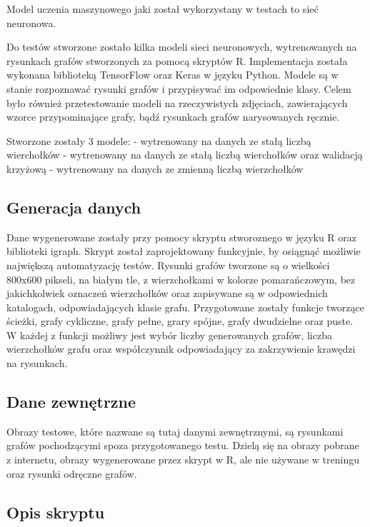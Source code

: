 Model uczenia maszynowego jaki został wykorzystany w testach to sieć neuronowa.

Do testów stworzone zostało kilka modeli sieci neuronowych,
wytrenowanych na rysunkach grafów stworzonych za pomocą skryptów R.
Implementacja została wykonana biblioteką TensorFlow oraz Keras w języku Python.
Modele są w stanie rozpoznawać rysunki grafów i przypisywać im odpowiednie klasy.
Celem było również przetestowanie modeli na rzeczywistych zdjęciach,
zawierających wzorce przypominające grafy, bądź rysunkach grafów narysowanych ręcznie.

Stworzone zostały 3 modele:
- wytrenowany na danych ze stałą liczbą wierchołków
- wytrenowany na danych ze stałą liczbą wierchołków oraz walidacją krzyżową
- wytrenowany na danych ze zmienną liczbą wierzchołków

\subsection{Generacja danych}
Dane wygenerowane zostały przy pomocy skryptu stworoznego w języku R oraz biblioteki igraph.
Skrypt został zaprojektowany funkcyjnie, by osiągnąć możliwie największą automatyzację testów.
Rysunki grafów tworzone są o wielkości 800x600 pikseli, na białym tle, z wierzchołkami w kolorze pomarańczowym,
bez jakichkolwiek oznaczeń wierzchołków oraz zapisywane są w odpowiednich katalogach, odpowiadających klasie grafu.
Przygotowane zostały funkcje tworzące ścieżki, grafy cykliczne, grafy pełne, grary spójne, grafy dwudzielne oraz puste.
W każdej z funkcji możliwy jest wybór liczby generowanych grafów, liczba wierzchołków grafu
oraz współczynnik odpowiadający za zakrzywienie krawędzi na rysunkach.

\subsection{Dane zewnętrzne}
Obrazy testowe, które nazwane są tutaj danymi zewnętrznymi, są rysunkami grafów pochodzącymi spoza przygotowanego testu.
Dzielą się na obrazy pobrane z internetu, obrazy wygenerowane przez skrypt w R, ale nie używane w treningu
oraz rysunki odręczne grafów.

\subsection{Opis skryptu}

